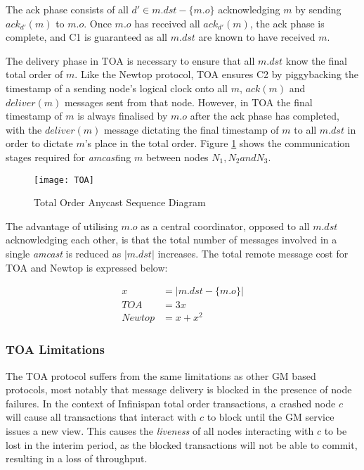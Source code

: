 			The ack phase consists of all $d' \in m.dst-\{m.o\}$ acknowledging $m$ by sending $ack_{d'}(m)$ to $m.o$.  Once $m.o$ has received all $ack_{d'}(m)$, the ack phase is complete, and C1 is guaranteed as all $m.dst$ are known to have received $m$.  
			
			The delivery phase in TOA is necessary to ensure that all $m.dst$ know the final total order of $m$. Like the Newtop protocol, TOA ensures C2 by piggybacking the timestamp of a sending node's logical clock onto all $m$, $ack(m)$ and $deliver(m)$ messages sent from that node.  However, in TOA the final timestamp of $m$ is always finalised by $m.o$ after the ack phase has completed, with the $deliver(m)$ message dictating the final timestamp of $m$ to all $m.dst$ in order to dictate $m$'s place in the total order.  Figure \ref{fig:TOA} shows the communication stages required for \emph{amcast}ing $m$ between nodes $N_1, N_2 and N_3$.  
			
            \begin{figure}[htbp!] 
                \centering    
                \texttt{[image: TOA]}
                \caption[Total Order Anycast Protocol]{Total Order Anycast Sequence Diagram}
                \label{fig:TOA}
            \end{figure}	 			
			
			The advantage of utilising $m.o$ as a central coordinator, opposed to all $m.dst$ acknowledging each other, is that the total number of messages involved in a single \emph{amcast} is reduced as $\left\vert m.dst \right\vert$ increases.  The total remote message cost for TOA and Newtop is expressed below:
			
			\begin{equation*}
		     \begin{aligned}
		       x &= \left\vert m.dst-\{m.o\} \right\vert \\
		       TOA & = 3x \\
		       Newtop & = x + x^2
		     \end{aligned}
		    \end{equation*}

	        \subsubsection*{TOA Limitations}
			The TOA protocol suffers from the same limitations as other GM based protocols, most notably that message delivery is blocked in the presence of node failures.  In the context of Infinispan total order transactions, a crashed node $c$ will cause all transactions that interact with $c$ to block until the GM service issues a new view.  This causes the \emph{liveness} of all nodes interacting with $c$ to be lost in the interim period, as the blocked transactions will not be able to commit, resulting in a loss of throughput.  
	        
